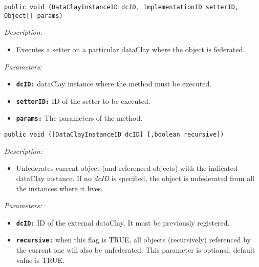 
\begin{dBox}
\texttt{public void (DataClayInstanceID dcID, \newline ImplementationID setterID, Object[] params)} 
\LINE

{\it Description:}

\begin{itemize}
  \item Executes a setter on a particular dataClay where the object is federated.
\end{itemize}

{\it Parameters:}

\begin{itemize}
  \item \texttt{\bfseries dcID:} dataClay instance where the method must be executed.
  \item \texttt{\bfseries setterID:} ID of the setter to be executed.
  \item \texttt{\bfseries params:} The parameters of the method.
\end{itemize}
 
\end{dBox}

\begin{dBox}

\texttt{public void ([DataClayInstanceID dcID] [,boolean recursive])}
\LINE

{\it Description:}

\begin{itemize}
  \item Unfederates current object (and referenced objects) with the indicated dataClay instance. If no \textit{dcID} is specified, the object is unfederated from all the instances where it lives.
\end{itemize}

{\it Parameters:}

\begin{itemize}
  \item \texttt{\bfseries dcID:} ID of the external dataClay. It must be previously registered.
  \item \texttt{\bfseries recursive:} when this flag is TRUE, all objects (recursively) referenced by the current one will also be unfederated. This parameter is optional, default value is TRUE.
\end{itemize}

\end{dBox}

